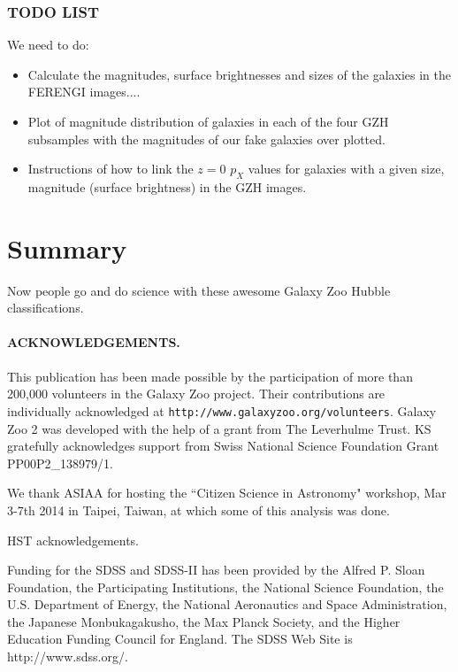 \documentclass[usenatbib]{mn2e}
\begin{document}
\subsubsection{TODO LIST}
We need to do: 
\begin{itemize}
\item Calculate the magnitudes, surface brightnesses and sizes of the galaxies in the FERENGI images....
\item Plot of magnitude distribution of galaxies in each of the four GZH subsamples with the magnitudes of our fake galaxies over plotted. 
\item Instructions of how to link the $z=0$ $p_X$ values for galaxies with a given size, magnitude (surface brightness) in the GZH images. 
\end{itemize}



\section{Summary}

Now people go and do science with these awesome Galaxy Zoo Hubble classifications.  
 
 
\paragraph*{ACKNOWLEDGEMENTS.} 

This publication has been made possible by the participation of more than 200,000 volunteers in the Galaxy Zoo project. Their contributions are individually acknowledged at \texttt{http://www.galaxyzoo.org/volunteers}. Galaxy Zoo 2 was developed with the help of a grant from The Leverhulme Trust. KS gratefully acknowledges support from Swiss National Science Foundation Grant PP00P2\_138979/1.

We thank ASIAA for hosting the ``Citizen Science in Astronomy" workshop, Mar 3-7th 2014 in Taipei, Taiwan, at which some of this analysis was done. 

HST acknowledgements.

Funding for the SDSS and SDSS-II has been provided by the Alfred P. Sloan Foundation, the Participating Institutions, the National Science Foundation, the U.S. Department of Energy, the National Aeronautics and Space Administration, the Japanese Monbukagakusho, the Max Planck Society, and the Higher Education Funding Council for England. The SDSS Web Site is http://www.sdss.org/. 
\end{document}
